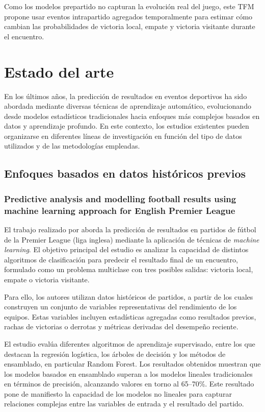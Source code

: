 Como los modelos prepartido no capturan la evolución real del juego, este TFM propone usar eventos intrapartido agregados temporalmente para estimar cómo cambian las probabilidades de victoria local, empate y victoria visitante durante el encuentro.

\section{Estado del arte}
En los últimos años, la predicción de resultados en eventos deportivos ha sido abordada mediante diversas técnicas de aprendizaje automático, evolucionando desde modelos estadísticos tradicionales hacia enfoques más complejos basados en datos y aprendizaje profundo. En este contexto, los estudios existentes pueden organizarse en diferentes líneas de investigación en función del tipo de datos utilizados y de las metodologías empleadas.

\subsection{Enfoques basados en datos históricos previos}

\subsubsection{Predictive analysis and modelling football results using machine learning approach for English Premier League}

El trabajo realizado por \cite{baboota2019predictive} aborda la predicción de resultados en partidos de fútbol de la Premier League (liga inglesa) mediante la aplicación de técnicas de \textit{machine learning}. El objetivo principal del estudio es analizar la capacidad de distintos algoritmos de clasificación para predecir el resultado final de un encuentro, formulado como un problema multiclase con tres posibles salidas: victoria local, empate o victoria visitante.

Para ello, los autores utilizan datos históricos de partidos, a partir de los cuales construyen un conjunto de variables representativas del rendimiento de los equipos. Estas variables incluyen estadísticas agregadas como resultados previos, rachas de victorias o derrotas y métricas derivadas del desempeño reciente.

El estudio evalúa diferentes algoritmos de aprendizaje supervisado, entre los que destacan la regresión logística, los árboles de decisión y los métodos de ensamblado, en particular Random Forest. Los resultados obtenidos muestran que los modelos basados en ensamblado superan a los modelos lineales tradicionales en términos de precisión, alcanzando valores en torno al 65--70\%. Este resultado pone de manifiesto la capacidad de los modelos no lineales para capturar relaciones complejas entre las variables de entrada y el resultado del partido.


